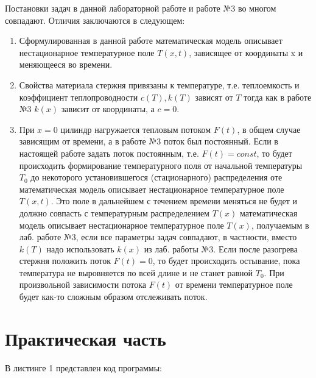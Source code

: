 \documentclass[a4paper, 14pt]{article}
\begin{document}
Постановки задач в данной лабораторной  работе и работе №3 во многом совпадают. Отличия заключаются в следующем:
\begin{enumerate}
\item Сформулированная в данной работе  математическая модель описывает нестационарное температурное поле  $T(x,t)$, зависящее от координаты x и меняющееся во времени. 
\item Свойства материала стержня привязаны к температуре, т.е. теплоемкость и коэффициент теплопроводности $c(T), k(T)$  зависят от  $T$ тогда как в работе №3 $k(x)$ зависит от координаты, а  $c = 0$.  
\item При $x = 0$  цилиндр нагружается тепловым потоком  $F(t)$, в общем случае зависящим от времени, а в работе №3 поток был постоянный.  
Если в настоящей работе задать  поток постоянным, т.е.  $F(t)=const$, то  будет происходить формирование температурного поля от начальной температуры $T_0$ до некоторого установившегося (стационарного) распределения  оте  математическая модель описывает нестационарное температурное поле  $T(x,t)$. Это поле в дальнейшем с течением времени меняться не будет и должно совпасть с температурным распределением  $T(x)$  математическая модель описывает нестационарное температурное поле  $T(x)$, получаемым в лаб. работе №3, если все параметры задач совпадают, в частности, вместо  $k(T)$  надо использовать $k(x)$ из лаб. работы №3. 
Если после разогрева стержня положить поток  $F(t)=0$, то будет происходить остывание, пока температура не выровняется по всей длине и не станет равной  $T_0$.
При произвольной зависимости потока  $F(t)$ от времени температурное поле будет как-то сложным образом отслеживать поток.
\end{enumerate}

\section*{Практическая часть}

В листинге 1 представлен код программы:
\end{document}
